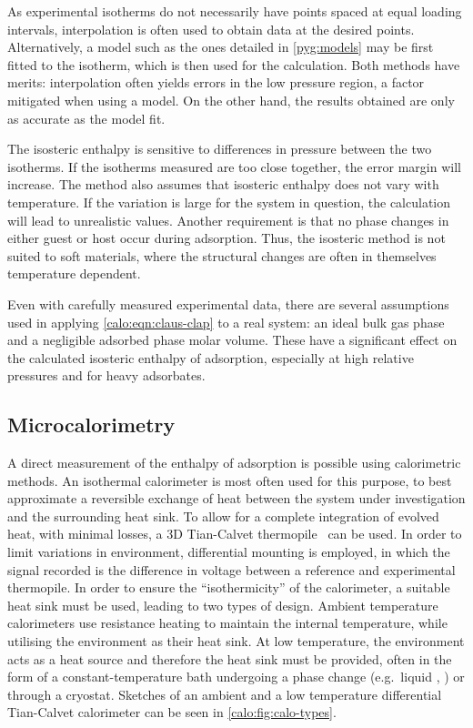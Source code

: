 As experimental isotherms do not necessarily have points spaced
at equal loading intervals, interpolation is often used to obtain
data at the desired points. Alternatively, a model such as the 
ones detailed in \autoref{pyg:models} may be first
fitted to the isotherm, which is then used for the calculation.
Both methods have merits: interpolation often yields errors 
in the low pressure region, a factor mitigated when using a model.
On the other hand, the results obtained are only as accurate as the
model fit.

The isosteric enthalpy is sensitive to differences in pressure between
the two isotherms. If the isotherms measured are too close together,
the error margin will increase. The method also assumes that isosteric
enthalpy does not vary with temperature. If the
variation is large for the system in question, the calculation will
lead to unrealistic values. Another requirement is that no phase 
changes in either guest or host occur during adsorption. Thus,
the isosteric method is not suited to soft materials, where the
structural changes are often in themselves temperature dependent.

Even with carefully measured experimental data, there are several
assumptions used in applying \autoref{calo:eqn:claus-clap} to
a real system: 
an ideal bulk gas phase and a negligible adsorbed phase
molar volume. These have a significant effect on the calculated
isosteric enthalpy of adsorption, especially at high relative pressures
and for heavy adsorbates.

\subsection{Microcalorimetry}\label{calo:method:calo}

A direct measurement of the enthalpy of adsorption is possible using
calorimetric methods.
An isothermal calorimeter is most often used for this purpose,
to best approximate a reversible exchange of heat between the
system under investigation and the surrounding
heat sink. To allow for a complete integration of evolved heat,
with minimal losses, a 3D Tian-Calvet thermopile~\cite{calvetRecentProgressMicrocalorimetry1963}
can be used. In order to limit variations in environment,
differential mounting is employed, in which the signal recorded
is the difference in voltage between a reference and experimental
thermopile. In order to ensure the ``isothermicity'' of the calorimeter, a
suitable heat sink must be used, leading to two types of design.
Ambient temperature calorimeters use resistance heating to
maintain the internal temperature, while utilising the environment
as their heat sink. At low temperature, the
environment acts as a heat source and therefore the heat sink must
be provided, often in the form of a constant-temperature bath
undergoing a phase change (e.g.\ liquid , ) 
or through a cryostat. Sketches of
an ambient and a low temperature differential Tian-Calvet calorimeter
can be seen in \autoref{calo:fig:calo-types}.

